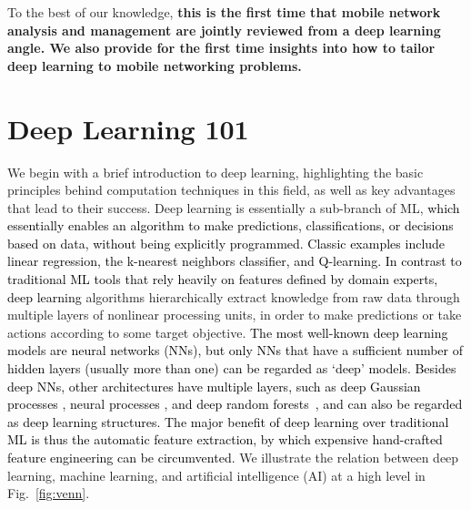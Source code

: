 \documentclass[journal,comsoc,letter]{IEEEtran}
\newcommand{\edit}[1]{\textcolor{black}{#1}}
\begin{document}
To the best of our knowledge, \textbf{this is the first time that mobile network analysis and management are jointly reviewed from a deep learning angle. We also provide for the first time insights into how to tailor deep learning to mobile networking problems.}

\section{Deep Learning 101}\label{sec:back}
We begin with a brief introduction to deep learning, highlighting the basic principles behind computation techniques in this field, as well as key advantages that lead to their success. Deep learning is essentially a sub-branch of ML, \edit{which essentially enables an algorithm to make predictions, classifications, or decisions based on data, without being explicitly programmed. Classic examples include linear regression, the k-nearest neighbors classifier, and Q-learning. In contrast to traditional ML tools that rely heavily on features defined by domain experts, deep learning} algorithms hierarchically extract knowledge from raw data through multiple layers of nonlinear processing units, in order to make predictions or take actions according to some target objective. \edit{The most well-known deep learning models are neural networks (NNs), but only NNs that have a sufficient number of hidden layers (usually more than one) can be regarded as `deep' models. Besides deep NNs, other architectures have multiple layers, such as deep Gaussian processes \cite{damianou2013deep2}, neural processes \cite{garnelo2018neural}, and deep random forests~\cite{zhou2017deep2}, and can also be regarded as deep learning structures.
The major benefit of deep learning over traditional ML is thus the automatic feature extraction, by which expensive hand-crafted feature engineering can be circumvented.} 
We illustrate the relation between deep learning, machine learning, and artificial intelligence (AI) at a high level in Fig.~\ref{fig:venn}. 
\end{document}

